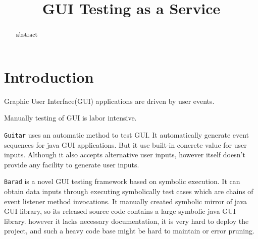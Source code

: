 \documentclass[blind]{sig-alternate-05-2015}
\begin{document}






%

\title{GUI Testing as a Service}


\maketitle

\begin{abstract}
  abstract
\end{abstract}

\section{Introduction}\label{section:introduction}

Graphic User Interface(GUI) applications are driven by user events.

Manually testing of GUI is labor intensive.

\texttt{Guitar} \cite{guitar} uses an automatic method to test GUI. It automatically generate event sequences for java GUI applications. But it use built-in concrete value for user inputs. Although it also accepts alternative user inputs, however itself doesn't provide any facility to generate user inputs.

\texttt{Barad} \cite{barad} is a novel GUI testing framework based on symbolic execution. It can obtain data inputs through executing symbolically test cases which are chains of event listener method invocations. It manually created symbolic mirror of java GUI library, so its released source code contains a large symbolic java GUI library. however it lacks necessary documentation, it is very hard to deploy the project, and such a heavy code base might be hard to maintain or error pruning.
\end{document}
